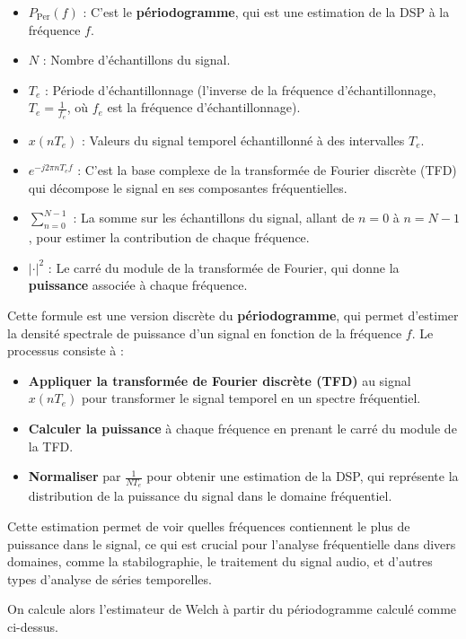 \begin{itemize}
    \item $P_{\text{Per}}(f)$ : C'est le \textbf{périodogramme}, qui est une estimation de la DSP à la fréquence $f$.
    \item $N$ : Nombre d'échantillons du signal.
    \item $T_e$ : Période d'échantillonnage (l'inverse de la fréquence d'échantillonnage, $T_e = \frac{1}{f_e}$, où $f_e$ est la fréquence d'échantillonnage).
    \item $x(nT_e)$ : Valeurs du signal temporel échantillonné à des intervalles $T_e$.
    \item $e^{-j2\pi n T_e f}$ : C'est la base complexe de la transformée de Fourier discrète (TFD) qui décompose le signal en ses composantes fréquentielles.
    \item $\sum_{n=0}^{N-1}$ : La somme sur les échantillons du signal, allant de $n=0$ à $n=N-1$, pour estimer la contribution de chaque fréquence.
    \item $\left| \cdot \right|^2$ : Le carré du module de la transformée de Fourier, qui donne la \textbf{puissance} associée à chaque fréquence.
\end{itemize}

Cette formule est une version discrète du \textbf{périodogramme}, qui permet d'estimer la densité spectrale de puissance d'un signal en fonction de la fréquence $f$. Le processus consiste à :
\begin{itemize}
    \item \textbf{Appliquer la transformée de Fourier discrète (TFD)} au signal $x(nT_e)$ pour transformer le signal temporel en un spectre fréquentiel.
    \item \textbf{Calculer la puissance} à chaque fréquence en prenant le carré du module de la TFD.
    \item \textbf{Normaliser} par $\frac{1}{N T_e}$ pour obtenir une estimation de la DSP, qui représente la distribution de la puissance du signal dans le domaine fréquentiel.
\end{itemize}

Cette estimation permet de voir quelles fréquences contiennent le plus de puissance dans le signal, ce qui est crucial pour l'analyse fréquentielle dans divers domaines, comme la stabilographie, le traitement du signal audio, et d'autres types d'analyse de séries temporelles.

On calcule alors l’estimateur de Welch à partir du périodogramme calculé comme ci-dessus.

